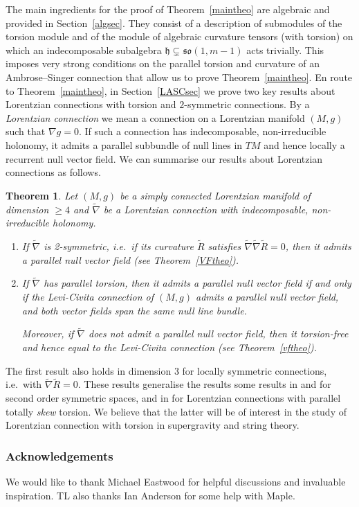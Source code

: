\documentclass[11pt,a4paper]{amsart}
\newcommand{\tnab}{\widetilde{\nabla}}
\newcommand{\tR}{\widetilde{R}}
\newcommand{\h}{\mathfrak{h}}
\newcommand{\+}{\oplus}
\newcommand{\so}{\mathfrak{so}}
\newcommand{\1}{\mathbf{1}}
\newcommand{\<}{\langle}
\renewcommand{\>}{\rangle}
\theoremstyle{definition}
\theoremstyle{plain}
\newtheorem{theorem}[definition]{Theorem}
\numberwithin{equation}{section}
\begin{document}
 The main ingredients for the proof of Theorem~\ref{maintheo} are algebraic and provided in Section~\ref{algsec}. They consist of a description of submodules of the torsion module and of the module of algebraic curvature tensors (with torsion) on which an indecomposable subalgebra $\h\subsetneq\so(1,m-1)$ acts trivially.  This imposes very strong conditions on the parallel torsion and curvature of an Ambrose--Singer connection that allow us to prove Theorem~\ref{maintheo}. En route to Theorem~\ref{maintheo}, in Section~\ref{LASCsec} we prove two key results about Lorentzian connections with torsion and $2$-symmetric connections. By a {\em Lorentzian connection} we mean a connection on a Lorentzian manifold $(M,g)$ such that $\nabla g=0$. If such a connection has indecomposable, non-irreducible holonomy, it admits a parallel subbundle of null lines in $TM$ and hence locally a recurrent null vector field. We can summarise our results about Lorentzian connections as follows.
\begin{theorem}
Let $(M,g)$ be a simply connected Lorentzian manifold of dimension $\ge 4$ and $\tnab$ be a Lorentzian connection with indecomposable, non-irreducible holonomy. 
\begin{enumerate}
\item If $\tnab$ is  2-symmetric, i.e.~if its curvature $\tR$ satisfies $\tnab\tnab \tR=0$, then it admits a parallel null vector field (see Theorem~\ref{VFtheo}).
\item If $\tnab$ has parallel torsion, then it admits a parallel null vector field if and only if the Levi-Civita connection of $(M,g)$ admits a parallel null vector field, and both vector fields span the same null line bundle. 

Moreover, if $\tnab$ does not admit a parallel null vector field, then it torsion-free and hence  equal to the Levi-Civita connection (see Theorem~\ref{vftheo}).
\end{enumerate}
\end{theorem}
The first result also holds in dimension $3$ for locally symmetric connections, i.e.~with $\tnab\tR=0$. These results generalise the results 
some results in \cite{senovilla08} and \cite{AlekseevskyGalaev11} for second order symmetric spaces, and 
in \cite{ErnstGalaev22,ErnstGalaev23} for Lorentzian connections with parallel totally {\em skew} torsion. We believe that the latter will be of interest in the study of Lorentzian connection with torsion in supergravity and string theory.


\subsubsection*{Acknowledgements} We would like to thank Michael Eastwood for helpful discussions and invaluable inspiration. TL also  thanks Ian Anderson for some help with Maple.
\end{document}
